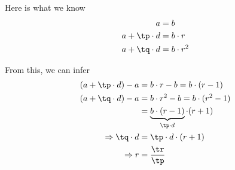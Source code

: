 \watchout

\ifprintanswers
\fi 

\begin{solution}[\halfpage]
	Here is what we know 
	\begin{align}
		a &= b \\
		a + \tp\cdot d &= b\cdot r \\
		a + \tq\cdot d &= b\cdot r^2 
	\end{align}
	
	From this, we can infer 
	\begin{align}
		(a + \tp\cdot d) - a &= b\cdot r - b = b\cdot(r-1) \\
		(a + \tq\cdot d) - a &= b\cdot r^2 - b = b\cdot(r^2-1) \\ 
		&= \underbrace{b\cdot(r-1)}_{\tp\cdot d}\cdot(r+1) \\
		\Rightarrow \tq\cdot d &= \tp\cdot d \cdot (r + 1) \\ 
		\Rightarrow r &= \dfrac{\tr}{\tp}
	\end{align}
\end{solution}
